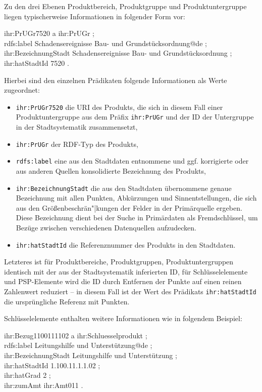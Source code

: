 \documentclass[a4paper,11pt,twoside]{article}
\begin{document}
Zu den drei Ebenen Produktbereich, Produktgruppe und Produktuntergruppe liegen
typischerweise Informationen in folgender Form vor:
\begin{code}
  ihr:PrUGr7520 a ihr:PrUGr ;\+\\
  rdfs:label {\dq}Schadensereignisse Bau- und Grundstücksordnung{\dq}@de ;\\
  ihr:BezeichnungStadt {\dq}Schadensereignisse Bau- und Grundstücksordnung{\dq} ;\\
  ihr:hatStadtId {\dq}7520{\dq} .
\end{code}

Hierbei sind den einzelnen Prädikaten folgende Informationen als Werte
zugeordnet:
\begin{itemize}
\item \texttt{ihr:PrUGr7520} die URI des Produkts, die sich in diesem Fall
  einer Produktuntergruppe aus dem Präfix \texttt{ihr:PrUGr} und der ID der
  Untergruppe in der Stadtsystematik zusammensetzt,
\item \texttt{ihr:PrUGr} der RDF-Typ des Produkts,
\item \texttt{rdfs:label} eine aus den Stadtdaten entnommene und
  ggf. korrigierte oder aus anderen Quellen konsolidierte Bezeichnung des
  Produkts,
\item \texttt{ihr:BezeichnungStadt} die aus den Stadtdaten übernommene genaue
  Bezeichnung mit allen Punkten, Abkürzungen und Sinnentstellungen, die sich
  aus den Größenbeschrän"|kungen der Felder in der Primärquelle ergeben. Diese
  Bezeichnung dient bei der Suche in Primärdaten als Fremdschlüssel, um Bezüge
  zwischen verschiedenen Datenquellen aufzudecken.
\item \texttt{ihr:hatStadtId} die Referenznummer des Produkts in den Stadtdaten.
\end{itemize}
Letzteres ist für Produktbereiche, Produktgruppen, Produktuntergruppen
identisch mit der aus der Stadtsystematik inferierten ID, für Schlüsselelemente
und PSP-Elemente wird die ID durch Entfernen der Punkte auf einen reinen
Zahlenwert reduziert -- in diesem Fall ist der Wert des Prädikats
\texttt{ihr:hatStadtId} die ursprüngliche Referenz mit Punkten.

Schlüsselelemente enthalten weitere Informationen wie in folgendem Beispiel:
\begin{code}
  ihr:Bezug1100111102 a ihr:Schluesselprodukt ;\+\\
  rdfs:label {\dq}Leitungshilfe und Unterstützung{\dq}@de ;\\
  ihr:BezeichnungStadt {\dq}Leitungshilfe und Unterstützung{\dq} ;\\
  ihr:hatStadtId {\dq}1.100.11.1.1.02{\dq} ;\\
  ihr:hatGrad {\dq}2{\dq} ;\\
  ihr:zumAmt ihr:Amt011 .
\end{code}
\end{document}
